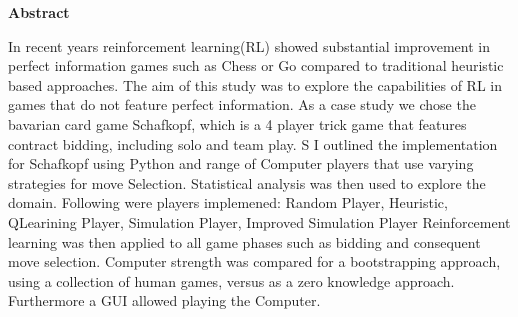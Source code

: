 %
%
\vspace*{2cm}

\begin{center}
    \textbf{Abstract}
\end{center}

\vspace*{1cm}

\noindent In recent years reinforcement learning(RL) showed substantial improvement in perfect information games such
as Chess or Go compared to traditional heuristic based approaches.
The aim of this study was to explore the capabilities of RL in games that do not feature perfect information.
As a case study we chose the bavarian card game Schafkopf, which is a 4 player trick game that features contract
bidding, including solo and team play. S
I outlined the implementation for Schafkopf using Python and range of Computer players that use varying strategies
for move Selection. Statistical analysis was then used to explore the domain.
Following were players implemened: Random Player, Heuristic, QLearining Player, Simulation Player, Improved
Simulation Player
Reinforcement learning was then applied to all game phases such as bidding and consequent move selection.
Computer strength was compared for a bootstrapping approach, using a collection of human games, versus as a zero
knowledge approach.
Furthermore a GUI allowed playing the Computer.
